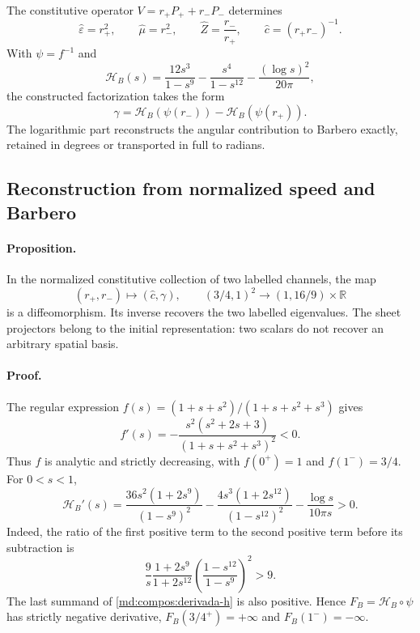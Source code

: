 The constitutive operator $V=r_+P_++r_-P_-$ determines
\begin{equation}
 \widehat\varepsilon=r_+^2,\qquad \widehat\mu=r_-^2,
 \qquad \widehat Z=\frac{r_-}{r_+},\qquad
 \widehat c=(r_+r_-)^{-1}.
 \label{md:compos:lectores-constitutivos}
\end{equation}
With $\psi=f^{-1}$ and
\begin{equation}
 \mathcal H_B(s)=\frac{12s^3}{1-s^9}
 -\frac{s^4}{1-s^{12}}-\frac{(\log s)^2}{20\pi},
 \label{md:compos:h-barbero}
\end{equation}
the constructed factorization takes the form
\begin{equation}
 \gamma=\mathcal H_B(\psi(r_-))-\mathcal H_B(\psi(r_+)).
 \label{md:compos:factorizacion-barbero}
\end{equation}
The logarithmic part reconstructs the angular contribution to Barbero
exactly, retained in degrees or transported in full to radians.

\subsection{Reconstruction from normalized speed and Barbero}
\label{md:compos:difeomorfismo}

\paragraph{Proposition.}
In the normalized constitutive collection of two labelled channels, the map
\begin{equation}
 (r_+,r_-)\longmapsto(\widehat c,\gamma),\qquad
 (3/4,1)^2\longrightarrow(1,16/9)\times\mathbb R
 \label{md:compos:mapa-global}
\end{equation}
is a diffeomorphism. Its inverse recovers the two labelled eigenvalues.
The sheet projectors belong to the initial representation: two scalars do
not recover an arbitrary spatial basis.

\paragraph{Proof.}
The regular expression
$f(s)=(1+s+s^2)/(1+s+s^2+s^3)$ gives
\begin{equation}
 f'(s)=-\frac{s^2(s^2+2s+3)}{(1+s+s^2+s^3)^2}<0.
 \label{md:compos:derivada-f}
\end{equation}
Thus $f$ is analytic and strictly decreasing, with $f(0^+)=1$ and
$f(1^-)=3/4$. For $0<s<1$,
\begin{equation}
 \mathcal H_B'(s)=
 \frac{36s^2(1+2s^9)}{(1-s^9)^2}
 -\frac{4s^3(1+2s^{12})}{(1-s^{12})^2}
 -\frac{\log s}{10\pi s}>0.
 \label{md:compos:derivada-h}
\end{equation}
Indeed, the ratio of the first positive term to the second positive term
before its subtraction is
\begin{equation}
 \frac{9}{s}\frac{1+2s^9}{1+2s^{12}}
 \left(\frac{1-s^{12}}{1-s^9}\right)^2>9.
 \label{md:compos:cota-derivada-h}
\end{equation}
The last summand of \eqref{md:compos:derivada-h} is also positive.
Hence $F_B=\mathcal H_B\circ\psi$ has strictly negative derivative,
$F_B(3/4^+)=+\infty$ and $F_B(1^-)=-\infty$.

